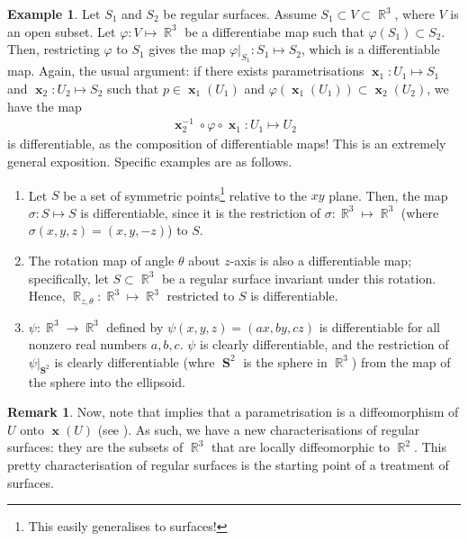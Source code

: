 \documentclass{amsart} %
\theoremstyle{mytheoremstyle}
\theoremstyle{definition}
\newtheorem{example}[definition]{Example}
\newtheorem{remark}[definition]{Remark}
\numberwithin{equation}{section}
\DeclareMathOperator{\R}{\mathbb{R}}
\DeclareMathOperator{\1}{\mathbbm{1}}
\DeclareMathOperator{\x}{\mathbf{x}}
\DeclareMathOperator{\sphere}{\mathbf{S}}
\renewcommand{\phi}{\varphi}
\renewcommand{\phi}{\varphi}
\begin{document}
\begin{example}
	\label{exampleR3diffeomorphisms}
	Let $S_1$ and $S_2$ be regular surfaces. Assume $S_1 \subset V \subset \R^3$, where $V$ is an open subset. Let $\phi: V \mapsto \R^3$ be a differentiabe map such that $\phi(S_1) \subset S_2$. Then, restricting $\phi$ to $S_1$ gives the map $\phi|_{S_1} : S_1 \mapsto S_2$, which is a differentiable map. Again, the usual argument: if there exists parametrisations $\x_1 : U_1 \mapsto S_1$ and $\x_2 : U_2 \mapsto S_2$ such that $p \in \x_1(U_1)$ and $\phi(\x_1(U_1)) \subset \x_2(U_2)$, we have the map
	\begin{align*}
		\x_2^{-1} \circ \phi \circ \x_1 : U_1 \mapsto U_2
	\end{align*}
	is differentiable, as the composition of differentiable maps! This is an extremely general exposition. Specific examples are as follows.
	
	\begin{enumerate}
		\item Let $S$ be a set of symmetric points\footnote{This easily generalises to surfaces!} relative to the $xy$ plane. Then, the map $\sigma: S \mapsto S$ is differentiable, since it is the restriction of $\sigma:\R^3 \mapsto \R^3$ (where $\sigma(x,y,z)=(x,y,-z)$) to $S$.
		
		\item The rotation map of angle $\theta$ about $z$-axis is also a differentiable map; specifically, let $S \subset \R^3$ be a regular surface invariant under this rotation. Hence, $\R_{z,\theta} : \R^3 \mapsto \R^3$ restricted to $S$ is differentiable.
		
		
		\item $\psi : \R^3 \to \R^3$ defined by $\psi(x,y,z) = (ax,by,cz)$ is differentiable for all nonzero real numbers $a,b,c$. $\psi$ is clearly differentiable, and the restriction of $\psi|_{\sphere^2}$ is clearly differentiable (whre $\sphere^2$ is the sphere in $\R^3$) from the map of the sphere into the ellipsoid.
	\end{enumerate}
\end{example}

\begin{remark}
	\label{remregularsurfacesarelocallydiffeomorphictoR2}
	Now, note that  implies that a parametrisation is a diffeomorphism of $U$ onto $\x(U)$ (see ). As such, we have a new characterisations of regular surfaces: they are the subsets of $\R^3$ that are locally diffeomorphic to $\R^2$. This pretty characterisation of regular surfaces is the starting point of a treatment of surfaces.
\end{remark}
\end{document}
